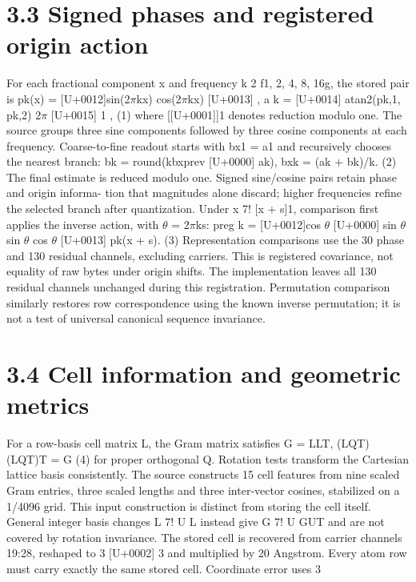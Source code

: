 \documentclass[11pt]{article}
\begin{document}
\section*{3.3 Signed phases and registered origin action}

For each fractional component x and frequency k 2 f1, 2, 4, 8, 16g, the stored pair is
pk(x) =
[U+0012]sin(2\ensuremath{\pi}kx)
cos(2\ensuremath{\pi}kx)
[U+0013]
, a k =
[U+0014] atan2(pk,1, pk,2)
2\ensuremath{\pi}
[U+0015]
1
, (1)
where [[U+0001]]1 denotes reduction modulo one. The source groups three sine components followed by three
cosine components at each frequency. Coarse-to-fine readout starts with bx1 = a1 and recursively
chooses the nearest branch:
bk = round(kbxprev [U+0000] ak), bxk = (ak + bk)/k. (2)
The final estimate is reduced modulo one. Signed sine/cosine pairs retain phase and origin informa-
tion that magnitudes alone discard; higher frequencies refine the selected branch after quantization.
Under x 7! [x + s]1, comparison first applies the inverse action, with \ensuremath{\theta} = 2\ensuremath{\pi}ks:
preg
k =
[U+0012]cos \ensuremath{\theta} [U+0000] sin \ensuremath{\theta}
sin \ensuremath{\theta} cos \ensuremath{\theta}
[U+0013]
pk(x + s). (3)
Representation comparisons use the 30 phase and 130 residual channels, excluding carriers. This
is registered covariance, not equality of raw bytes under origin shifts. The implementation leaves
all 130 residual channels unchanged during this registration. Permutation comparison similarly
restores row correspondence using the known inverse permutation; it is not a test of universal
canonical sequence invariance.

\section*{3.4 Cell information and geometric metrics}

For a row-basis cell matrix L, the Gram matrix satisfies
G = LLT, (LQT)(LQT)T = G (4)
for proper orthogonal Q. Rotation tests transform the Cartesian lattice basis consistently. The
source constructs 15 cell features from nine scaled Gram entries, three scaled lengths and three
inter-vector cosines, stabilized on a 1/4096 grid. This input construction is distinct from storing
the cell itself. General integer basis changes L 7! U L instead give G 7! U GUT and are not covered
by rotation invariance.
The stored cell is recovered from carrier channels 19:28, reshaped to 3 [U+0002] 3 and multiplied by
20 Angstrom. Every atom row must carry exactly the same stored cell. Coordinate error uses
3
\end{document}
